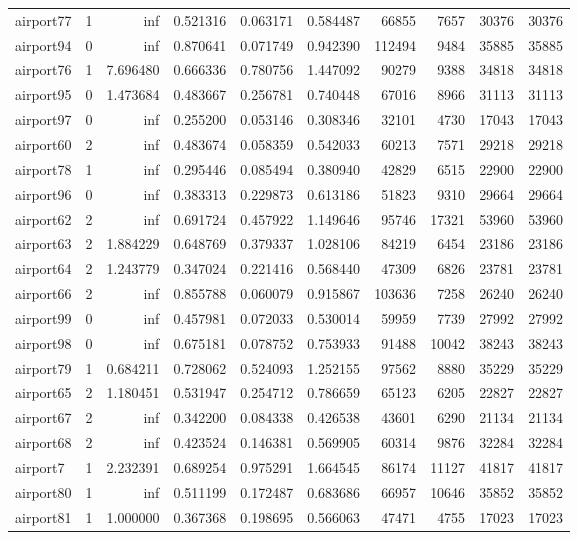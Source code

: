 \begin{longtable}{|l|r|r|r|r|r|r|r|r|r|}
airport77 & 1 & inf & 0.521316 & 0.063171 & 0.584487 & 66855 & 7657 & 30376 & 30376 \\
airport94 & 0 & inf & 0.870641 & 0.071749 & 0.942390 & 112494 & 9484 & 35885 & 35885 \\
airport76 & 1 & 7.696480 & 0.666336 & 0.780756 & 1.447092 & 90279 & 9388 & 34818 & 34818 \\
airport95 & 0 & 1.473684 & 0.483667 & 0.256781 & 0.740448 & 67016 & 8966 & 31113 & 31113 \\
airport97 & 0 & inf & 0.255200 & 0.053146 & 0.308346 & 32101 & 4730 & 17043 & 17043 \\
airport60 & 2 & inf & 0.483674 & 0.058359 & 0.542033 & 60213 & 7571 & 29218 & 29218 \\
airport78 & 1 & inf & 0.295446 & 0.085494 & 0.380940 & 42829 & 6515 & 22900 & 22900 \\
airport96 & 0 & inf & 0.383313 & 0.229873 & 0.613186 & 51823 & 9310 & 29664 & 29664 \\
airport62 & 2 & inf & 0.691724 & 0.457922 & 1.149646 & 95746 & 17321 & 53960 & 53960 \\
airport63 & 2 & 1.884229 & 0.648769 & 0.379337 & 1.028106 & 84219 & 6454 & 23186 & 23186 \\
airport64 & 2 & 1.243779 & 0.347024 & 0.221416 & 0.568440 & 47309 & 6826 & 23781 & 23781 \\
airport66 & 2 & inf & 0.855788 & 0.060079 & 0.915867 & 103636 & 7258 & 26240 & 26240 \\
airport99 & 0 & inf & 0.457981 & 0.072033 & 0.530014 & 59959 & 7739 & 27992 & 27992 \\
airport98 & 0 & inf & 0.675181 & 0.078752 & 0.753933 & 91488 & 10042 & 38243 & 38243 \\
airport79 & 1 & 0.684211 & 0.728062 & 0.524093 & 1.252155 & 97562 & 8880 & 35229 & 35229 \\
airport65 & 2 & 1.180451 & 0.531947 & 0.254712 & 0.786659 & 65123 & 6205 & 22827 & 22827 \\
airport67 & 2 & inf & 0.342200 & 0.084338 & 0.426538 & 43601 & 6290 & 21134 & 21134 \\
airport68 & 2 & inf & 0.423524 & 0.146381 & 0.569905 & 60314 & 9876 & 32284 & 32284 \\
airport7 & 1 & 2.232391 & 0.689254 & 0.975291 & 1.664545 & 86174 & 11127 & 41817 & 41817 \\
airport80 & 1 & inf & 0.511199 & 0.172487 & 0.683686 & 66957 & 10646 & 35852 & 35852 \\
airport81 & 1 & 1.000000 & 0.367368 & 0.198695 & 0.566063 & 47471 & 4755 & 17023 & 17023 \\

\end{longtable}
